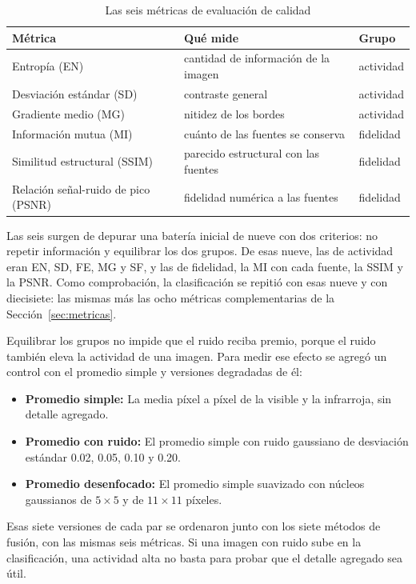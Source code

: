 \begin{table}[htbp]
\centering
\caption{Las seis métricas de evaluación de calidad}
\label{tab:metricas}
\setlength{\tabcolsep}{4pt}
\begin{tabular}{@{}lll@{}}
\toprule
\textbf{Métrica} & \textbf{Qué mide} & \textbf{Grupo} \\
\midrule
Entropía (EN)                        & cantidad de información de la imagen   & actividad \\
Desviación estándar (SD)             & contraste general                      & actividad \\
Gradiente medio (MG)                 & nitidez de los bordes                  & actividad \\
Información mutua (MI)               & cuánto de las fuentes se conserva      & fidelidad \\
Similitud estructural (SSIM)         & parecido estructural con las fuentes   & fidelidad \\
Relación señal-ruido de pico (PSNR)  & fidelidad numérica a las fuentes       & fidelidad \\
\bottomrule
\end{tabular}
\end{table}

Las seis surgen de depurar una batería inicial de nueve con dos criterios: no repetir información y
equilibrar los dos grupos. De esas nueve, las de actividad eran EN, SD, FE, MG y SF, y las de
fidelidad, la MI con cada fuente, la SSIM y la PSNR. Como comprobación, la
clasificación se repitió con esas nueve y con diecisiete: las mismas más las ocho métricas
complementarias de la Sección~\ref{sec:metricas}.

Equilibrar los grupos no impide que el ruido reciba premio, porque el ruido también eleva la actividad
de una imagen. Para medir ese efecto se agregó un control con el promedio simple y versiones degradadas
de él:
\begin{itemize}
\item \textbf{Promedio simple:} La media píxel a píxel de la visible y la infrarroja, sin detalle
agregado.
\item \textbf{Promedio con ruido:} El promedio simple con ruido gaussiano de desviación estándar 0.02,
0.05, 0.10 y 0.20.
\item \textbf{Promedio desenfocado:} El promedio simple suavizado con núcleos gaussianos de
$5 \times 5$ y de $11 \times 11$ píxeles.
\end{itemize}
Esas siete versiones de cada par se ordenaron junto con los siete métodos de fusión, con las mismas seis
métricas. Si una imagen con ruido sube en la clasificación, una actividad alta no basta para probar que
el detalle agregado sea útil.


